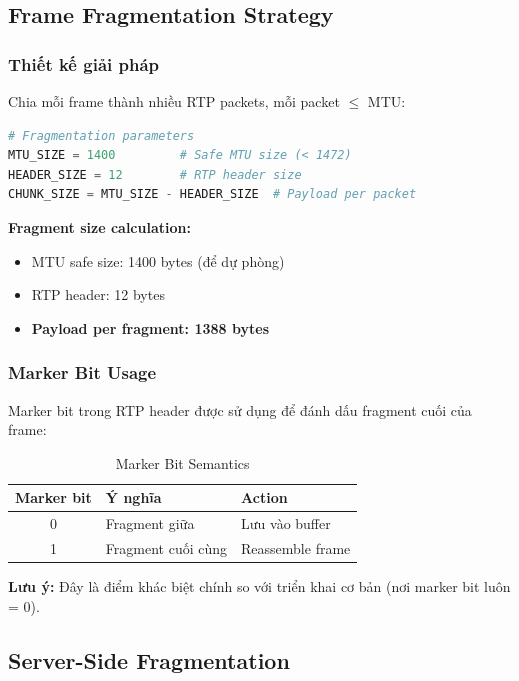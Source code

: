 \subsection{Frame Fragmentation Strategy}

\subsubsection{Thiết kế giải pháp}

Chia mỗi frame thành nhiều RTP packets, mỗi packet $\leq$ MTU:

\begin{lstlisting}[language=Python, caption={Frame Fragmentation Constants}]
# Fragmentation parameters
MTU_SIZE = 1400         # Safe MTU size (< 1472)
HEADER_SIZE = 12        # RTP header size
CHUNK_SIZE = MTU_SIZE - HEADER_SIZE  # Payload per packet
\end{lstlisting}

\textbf{Fragment size calculation:}
\begin{itemize}
    \item MTU safe size: 1400 bytes (để dự phòng)
    \item RTP header: 12 bytes
    \item \textbf{Payload per fragment: 1388 bytes}
\end{itemize}

\subsubsection{Marker Bit Usage}

Marker bit trong RTP header được sử dụng để đánh dấu fragment cuối của frame:

\begin{table}[H]
\centering
\begin{tabular}{|c|l|l|}
\hline
\textbf{Marker bit} & \textbf{Ý nghĩa} & \textbf{Action} \\
\hline
0 & Fragment giữa & Lưu vào buffer \\
1 & Fragment cuối cùng & Reassemble frame \\
\hline
\end{tabular}
\caption{Marker Bit Semantics}
\end{table}

\textbf{Lưu ý:} Đây là điểm khác biệt chính so với triển khai cơ bản (nơi marker bit luôn = 0).

\subsection{Server-Side Fragmentation}


